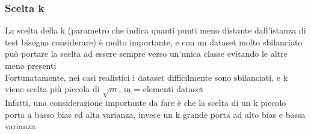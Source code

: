 \documentclass[10pt,oneside,a4paper]{article}
\begin{document}
	\subsubsection{Scelta k}
	La scelta della k (parametro che indica quanti punti meno distante dall'istanza di test bisogna considerare) è molto importante, e con un dataset molto sbilanciato può portare la scelta ad essere sempre verso un'unica classe evitando le altre meno presenti\\
	Fortunatamente, nei casi realistici i dataset difficilmente sono sbilanciati, e k viene scelta più piccola di $\sqrt{m}$, m = elementi dataset\\
	Infatti, una considerazione importante da fare è che la scelta di un k piccolo porta a basso bias ed alta varianza, invece un k grande porta ad alto bias e bassa varianza
	
\end{document}
